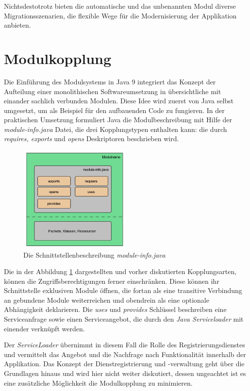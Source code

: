     Nichtsdestotrotz bieten die automatische und das unbenannten Modul diverse Migrationsszenarien, die flexible Wege für die Modernisierung der Applikation anbieten. 

  \section{Modulkopplung} \label{sec:mod_kop}
    Die Einführung des Modulsystems in Java 9 integriert das Konzept der Aufteilung einer monolithischen Softwareumsetzung in übersichtliche mit einander sachlich verbunden Modulen. Diese Idee wird zuerst von Java selbst umgesetzt, um als Beispiel für den aufbauenden Code zu fungieren. In der praktischen Umsetzung formuliert Java die Modulbeschreibung mit Hilfe der \textit{module-info.java} Datei, die drei Kopplungstypen enthalten kann: die durch \textit{requires, exports} und \textit{opens} Deskriptoren beschrieben wird.

    \begin{figure}[h!]
      \centering
      \includegraphics[width=0.5\textwidth]{material/images/module-info.png}
      \caption{Die Schnittstellenbeschreibung \textit{module-info.java}}
      \label{fig:module-info}
    \end{figure}

    Die in der Abbildung \ref{fig:module-info} dargestellten und vorher diskutierten Kopplungsarten, können die Zugriffsberechtigungen ferner einschränken. Diese können ihr Schnittstelle exklusiven Module öffnen, die fortan als eine transitive Verbindung an gebundene Module weiterreichen und obendrein als eine optionale Abhängigkeit deklarieren. Die \textit{uses} und \textit{provides} Schlüssel beschreiben eine Serviceanfrage sowie einen Serviceangebot, die durch den \textit{Java Serviceloader} mit einender verknüpft werden.
    

    Der \textit{ServiceLoader} übernimmt in diesem Fall die Rolle des Registrierungsdienstes und vermittelt das Angebot und die Nachfrage nach Funktionalität innerhalb der Applikation. Das Konzept der Dienstregistrierung und -verwaltung geht über die Grundlagen hinaus und wird hier nicht weiter diskutiert, dessen ungeachtet ist es eine zusätzliche Möglichkeit die Modulkopplung zu minimieren. \bigbreak
    
